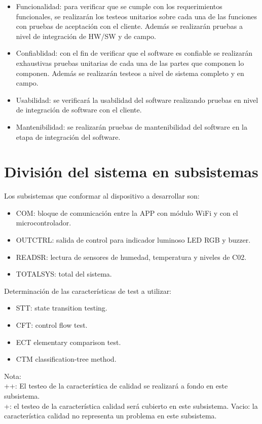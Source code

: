 \documentclass[12pt,a4paper, twosite]{article}
\begin{document}
\begin{itemize}
\item Funcionalidad: para verificar que se cumple con los requerimientos funcionales, se realizarán los testeos unitarios sobre cada una de las funciones con pruebas de aceptación con el cliente. Además se realizarán pruebas a nivel de integración de HW/SW y de campo.
\item Confiablidad: con el fin de verificar que el software es confiable se realizarán exhaustivas pruebas unitarias de cada una de las partes que componen lo componen. Además se realizarán testeos a nivel de sistema completo y en campo.
\item Usabilidad: se verificará la usabilidad del software realizando pruebas en nivel de integración de software con el cliente.
\item Mantenibilidad: se realizarán pruebas de mantenibilidad del software en la etapa de integración del software.
\end{itemize}

\section{División del sistema en subsistemas}

Los subsistemas que conformar al dispositivo a desarrollar son:
\begin{itemize}
\item COM: bloque de comunicación entre la APP con módulo WiFi y con el microcontrolador.
\item OUTCTRL: salida de control para indicador luminoso LED RGB y buzzer.
\item READSR: lectura de sensores de humedad, temperatura y niveles de C02.
\item TOTALSYS: total del sistema.
\end{itemize}


Determinación de las características de test a utilizar:
\begin{itemize}
\item STT: state transition testing.
\item CFT: control flow test.
\item ECT elementary comparison test.
\item CTM classification-tree method.
\end{itemize}

Nota:\\
++: El testeo de la característica de calidad se realizará a fondo en este subsistema.\\
+: el testeo de la característica calidad será cubierto en este subsistema.
Vacio: la característica calidad no representa un problema en este subsistema. \\
\end{document}
